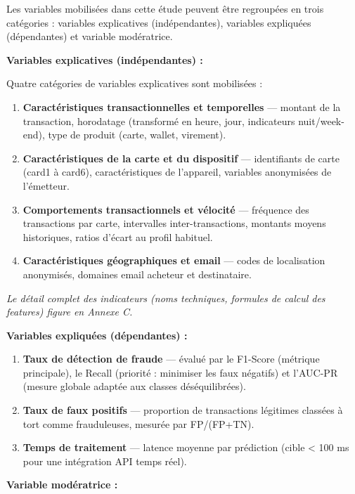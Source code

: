 \documentclass[
  12pt,
]{article}
\providecommand{\tightlist}{%
  \setlength{\itemsep}{0pt}\setlength{\parskip}{0pt}}
\begin{document}
Les variables mobilisées dans cette étude peuvent être regroupées en
trois catégories : variables explicatives (indépendantes), variables
expliquées (dépendantes) et variable modératrice.

\textbf{Variables explicatives (indépendantes) :}

Quatre catégories de variables explicatives sont mobilisées :

\begin{enumerate}
\def\labelenumi{\arabic{enumi}.}
\tightlist
\item
  \textbf{Caractéristiques transactionnelles et temporelles} — montant
  de la transaction, horodatage (transformé en heure, jour, indicateurs
  nuit/week-end), type de produit (carte, wallet, virement).
\item
  \textbf{Caractéristiques de la carte et du dispositif} — identifiants
  de carte (card1 à card6), caractéristiques de l’appareil, variables
  anonymisées de l’émetteur.
\item
  \textbf{Comportements transactionnels et vélocité} — fréquence des
  transactions par carte, intervalles inter-transactions, montants
  moyens historiques, ratios d’écart au profil habituel.
\item
  \textbf{Caractéristiques géographiques et email} — codes de
  localisation anonymisés, domaines email acheteur et destinataire.
\end{enumerate}

\emph{Le détail complet des indicateurs (noms techniques, formules de
calcul des features) figure en Annexe C.}

\textbf{Variables expliquées (dépendantes) :}

\begin{enumerate}
\def\labelenumi{\arabic{enumi}.}
\tightlist
\item
  \textbf{Taux de détection de fraude} — évalué par le F1-Score
  (métrique principale), le Recall (priorité : minimiser les faux
  négatifs) et l’AUC-PR (mesure globale adaptée aux classes
  déséquilibrées).
\item
  \textbf{Taux de faux positifs} — proportion de transactions légitimes
  classées à tort comme frauduleuses, mesurée par FP/(FP+TN).
\item
  \textbf{Temps de traitement} — latence moyenne par prédiction (cible
  \textless{} 100 ms pour une intégration API temps réel).
\end{enumerate}

\textbf{Variable modératrice :}
\end{document}
